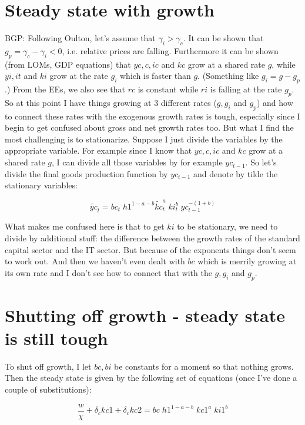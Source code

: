\documentclass{article}
\begin{document}
\section{Steady state with growth}
BGP: Following Oulton, let's assume that $\gamma_i > \gamma_c$. It can be shown that $g_p = \gamma_c - \gamma_i < 0$, i.e. relative prices are falling.
Furthermore it can be shown (from LOMs, GDP equations) that $yc, c, ic$ and $kc$ grow at a shared rate $g$, while $yi, it$ and $ki$ grow at the rate $g_i$ which is faster than $g$. (Something like $g_i = g - g_p$.) From the EEs, we also see that $rc$ is constant while $ri$ is falling at the rate $g_p$. So at this point I have things growing at 3 different rates ($g, g_i$ and $g_p$) and how to connect these rates with the exogenous growth rates is tough, especially since I begin to get confused about gross and net growth rates too. But what I find the most challenging is to stationarize. Suppose I just divide the variables by the appropriate variable. For example since I know that $yc, c, ic$ and $kc$ grow at a shared rate $g$, I can divide all those variables by for example $yc_{t-1}$. So let's divide the final goods production function by $yc_{t-1}$ and denote by tilde the stationary variables:

\begin{equation*}
\tilde{yc}_t = bc_t \; h1^{1-a-b} \tilde{kc}_t^a \; ki_t^b \; yc_{t-1}^{-(1+b)}
\end{equation*}

What makes me confused here is that to get $ki$ to be stationary, we need to divide by additional stuff: the difference between the growth rates of the standard capital sector and the IT sector. But because of the exponents things don't seem to work out. And then we haven't even dealt with $bc$ which is merrily growing at its own rate and I don't see how to connect that with the $g, g_i$ and $g_p$. 

\section{Shutting off growth - steady state is still tough}
 To shut off growth, I let $bc, bi$ be constants for a moment so that nothing grows. Then the steady state is given by the following set of equations (once I've done a couple of substitutions):


\begin{equation}
\frac{w}{\chi}  +\delta_c kc1 + \delta_c  kc2 = bc \; h1^{1-a-b} \; kc1^{a} \; ki1^{b}
\end{equation}
\end{document}
